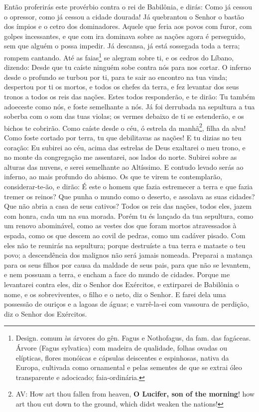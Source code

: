 Então proferirás este provérbio contra o rei de Babilônia, e
dirás: Como já cessou o opressor, como já cessou a cidade dourada!
Já quebrantou o Senhor o bastão dos ímpios e o cetro dos
dominadores. Aquele que feria aos povos com furor, com golpes
incessantes, e que com ira dominava sobre as nações agora é
perseguido, sem que alguém o possa impedir. Já descansa, já está
sossegada toda a terra; rompem cantando. Até as
faias\footnote{Design. comum às árvores do gên. Fagus e Nothofagus,
da fam. das fagáceas. Árvore (Fagus sylvatica) com madeira de
qualidade, folhas ovadas ou elípticas, flores monóicas e cápsulas
deiscentes e espinhosas, nativa da Europa, cultivada como ornamental
e pelas sementes de que se extrai óleo transparente e adocicado;
faia-ordinária.} se alegram sobre ti, e os cedros do Líbano,
dizendo: Desde que tu caíste ninguém sobe contra nós para nos
cortar. O inferno desde o profundo se turbou por ti, para te
sair ao encontro na tua vinda; despertou por ti os mortos, e todos
os chefes da terra, e fez levantar dos seus tronos a todos os reis
das nações. Estes todos responderão, e te dirão: Tu também
adoeceste como nós, e foste semelhante a nós. Já foi
derrubada na sepultura a tua soberba com o som das tuas violas; os
vermes debaixo de ti se estenderão, e os bichos te cobrirão.
Como caíste desde o céu, ó estrela da manhã\footnote{AV: How
art thou fallen from heaven, \textbf{O Lucifer, son of the morning}!
how art thou cut down to the ground, which didst weaken the
nations!}, filha da alva! Como foste cortado por terra, tu que
debilitavas as nações! E tu dizias no teu coração: Eu subirei
ao céu, acima das estrelas de Deus exaltarei o meu trono, e no monte
da congregação me assentarei, aos lados do norte. Subirei
sobre as alturas das nuvens, e serei semelhante ao Altíssimo.
E contudo levado serás ao inferno, ao mais profundo do
abismo. Os que te virem te contemplarão, considerar-te-ão, e
dirão: É este o homem que fazia estremecer a terra e que fazia
tremer os reinos? Que punha o mundo como o deserto, e
assolava as suas cidades? Que não abria a casa de seus cativos?
Todos os reis das nações, todos eles, jazem com honra, cada
um na sua morada. Porém tu és lançado da tua sepultura, como
um renovo abominável, como as vestes dos que foram mortos
atravessados à espada, como os que descem ao covil de pedras, como
um cadáver pisado. Com eles não te reunirás na sepultura;
porque destruíste a tua terra e mataste o teu povo; a descendência
dos malignos não será jamais nomeada. Preparai a matança para
os seus filhos por causa da maldade de seus pais, para que não se
levantem, e nem possuam a terra, e encham a face do mundo de
cidades. Porque me levantarei contra eles, diz o Senhor dos
Exércitos, e extirparei de Babilônia o nome, e os sobreviventes, o
filho e o neto, diz o Senhor. E farei dela uma possessão de
ouriços e a lagoas de águas; e varrê-la-ei com vassoura de perdição,
diz o Senhor dos Exércitos.

